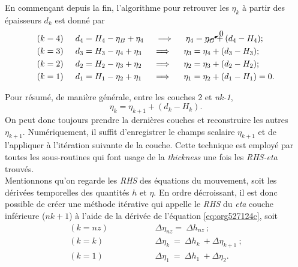 \documentclass[10pt]{article}
\numberwithin{equation}{section}
\begin{document}
En commençant depuis la fin, l'algorithme pour retrouver les \(\eta_k\) à partir des épaisseurs \(d_k\) est donné par
\begin{align}
        & (k=4) \hspace{0.5cm} d_4 = H_4 - \eta_B + \eta_4 \hspace{0.5cm} \Longrightarrow \hspace{0.5cm} \eta_4 = \cancelto{0}{\eta_B} + (d_4 - H_4); \\
        & (k=3) \hspace{0.5cm} d_3 = H_3 - \eta_4 + \eta_3 \hspace{0.5cm} \Longrightarrow \hspace{0.5cm} \eta_3 =\eta_4+(d_3-H_3);\\
        & (k=2) \hspace{0.5cm} d_2 = H_2 - \eta_3 + \eta_2 \hspace{0.5cm} \Longrightarrow \hspace{0.5cm} \eta_2 =\eta_3+(d_2-H_2);\\
        & (k=1) \hspace{0.5cm} d_1 = H_1 - \eta_2 + \eta_1 \hspace{0.5cm} \Longrightarrow \hspace{0.5cm} \eta_1 =\eta_2+(d_1-H_1) = 0.
\end{align}

Pour résumé, de manière générale, entre les couches 2 et \emph{nk-1},
\begin{equation}
\label{eq:org527124c}
\eta_k = \eta_{k+1} + (d_k - H_k).
\end{equation}
On peut donc toujours prendre la dernières couches et reconstruire les autres \(\eta_{k+1}\).
Numériquement, il suffit d'enregistrer le champs scalaire \(\eta_{k+1}\) et de l'appliquer à l'itération suivante de la couche.
Cette technique est employé par toutes les sous-routines qui font usage de la \emph{thickness} une fois les \emph{RHS-eta} trouvés.\\[0pt]


Mentionnons qu'on regarde les \emph{RHS} des équations du mouvement, soit les dérivées temporelles des quantités \(h\) et \(\eta\).
En ordre décroissant, il est donc possible de créer une méthode itérative qui appelle le \emph{RHS} du \emph{eta} couche inférieure (\(nk+1\)) à l'aide de la dérivée de l'équation \ref{eq:org527124c}, soit
\begin{align}
(k=nz)\hspace{2cm}    &\Delta \eta_{nz} =\ \Delta h_{nz}\ ;\nonumber\\
(k=k) \hspace{2cm} &\Delta \eta_{k}\ = \ \Delta h_k\ + \Delta \eta_{k+1}\ ;\\
(k=1) \hspace{2cm} &\Delta \eta_1\ = \ \Delta h_1\ + \Delta \eta_2. \nonumber 
\end{align}
\end{document}
